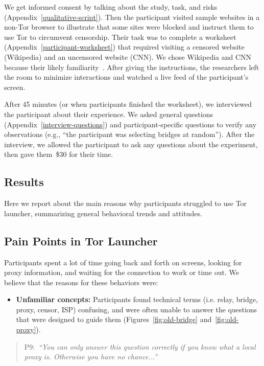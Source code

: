 \documentclass[USenglish,oneside,twocolumn]{article}
\newcommand{\pquote}[2]{
\begin{quotation}
\noindent #1:~\textit{#2}
\end{quotation}
}
\begin{document}
We get informed consent by talking about the study, task, and risks (Appendix~\ref{qualitative-script}). Then the participant visited sample websites in a non-Tor browser to illustrate that some sites were blocked and instruct them to use Tor to circumvent censorship. Their task was to complete a worksheet (Appendix~\ref{participant-worksheet}) that required visiting a censored website (Wikipedia) and an uncensored website (CNN). We chose Wikipedia and CNN because their likely familiarity~\cite{alexa}. After giving the instructions, the researchers left the room to minimize interactions and watched a live feed of the participant's screen.

After 45 minutes (or when participants finished the worksheet), we interviewed the participant about their experience. We asked general questions (Appendix~\ref{interview-questions}) and participant-specific questions to verify any observations (e.g., ``the participant was selecting bridges at random''). After the interview, we allowed the participant to ask any questions about the experiment, then gave them~\$30 for their time. 

\subsection{Results} 

Here we report about the main reasons why participants struggled to use Tor launcher, summarizing general behavioral trends and attitudes. 

\subsection{Pain Points in Tor Launcher} 
\label{sec:pain-points}
Participants spent a lot of time going back and forth on screens, looking for proxy information, and waiting for the connection to work or time out. We believe that the reasons for these behaviors were:\\

\begin{itemize}
\item {\bfseries Unfamiliar concepts:} Participants found technical terms (i.e. relay, bridge, proxy, censor, ISP) confusing, and were often unable to answer the questions that were designed to guide them (Figures~\ref{fig:old-bridge} and~\ref{fig:old-proxy}).
\end{itemize} 

\pquote{P9}{``You can only answer this question correctly if you know what a local proxy is.
Otherwise you have no chance...''}
\end{document}
